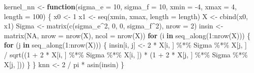 \documentclass[
]{article}
\newenvironment{Shaded}{\begin{snugshade}}{\end{snugshade}}
\newcommand{\AttributeTok}[1]{\textcolor[rgb]{0.77,0.63,0.00}{#1}}
\newcommand{\ConstantTok}[1]{\textcolor[rgb]{0.00,0.00,0.00}{#1}}
\newcommand{\ControlFlowTok}[1]{\textcolor[rgb]{0.13,0.29,0.53}{\textbf{#1}}}
\newcommand{\DecValTok}[1]{\textcolor[rgb]{0.00,0.00,0.81}{#1}}
\newcommand{\FunctionTok}[1]{\textcolor[rgb]{0.00,0.00,0.00}{#1}}
\newcommand{\NormalTok}[1]{#1}
\newcommand{\OtherTok}[1]{\textcolor[rgb]{0.56,0.35,0.01}{#1}}
\newcommand{\SpecialCharTok}[1]{\textcolor[rgb]{0.00,0.00,0.00}{#1}}
\begin{document}
\begin{Shaded}
\begin{Highlighting}[]
\NormalTok{kernel\_nn }\OtherTok{\textless{}{-}} \ControlFlowTok{function}\NormalTok{(}\AttributeTok{sigma\_e =} \DecValTok{10}\NormalTok{, }
                      \AttributeTok{sigma\_f =} \DecValTok{10}\NormalTok{, }
                      \AttributeTok{xmin =} \SpecialCharTok{{-}}\DecValTok{4}\NormalTok{, }
                      \AttributeTok{xmax =} \DecValTok{4}\NormalTok{, }
                      \AttributeTok{length =} \DecValTok{100}\NormalTok{) \{}
\NormalTok{  x0 }\OtherTok{\textless{}{-}} \DecValTok{1} 
\NormalTok{  x1 }\OtherTok{\textless{}{-}} \FunctionTok{seq}\NormalTok{(xmin, xmax, }\AttributeTok{length =}\NormalTok{ length)}
\NormalTok{  X }\OtherTok{\textless{}{-}} \FunctionTok{cbind}\NormalTok{(x0, x1)}
\NormalTok{  Sigma }\OtherTok{\textless{}{-}} \FunctionTok{matrix}\NormalTok{(}\FunctionTok{c}\NormalTok{(sigma\_e}\SpecialCharTok{\^{}}\DecValTok{2}\NormalTok{, }\DecValTok{0}\NormalTok{, }\DecValTok{0}\NormalTok{, sigma\_f}\SpecialCharTok{\^{}}\DecValTok{2}\NormalTok{), }\AttributeTok{nrow =} \DecValTok{2}\NormalTok{)}
\NormalTok{  insin }\OtherTok{\textless{}{-}} \FunctionTok{matrix}\NormalTok{(}\ConstantTok{NA}\NormalTok{, }\AttributeTok{nrow =} \FunctionTok{nrow}\NormalTok{(X), }\AttributeTok{ncol =} \FunctionTok{nrow}\NormalTok{(X))}
  \ControlFlowTok{for}\NormalTok{ (i }\ControlFlowTok{in} \FunctionTok{seq\_along}\NormalTok{(}\DecValTok{1}\SpecialCharTok{:}\FunctionTok{nrow}\NormalTok{(X))) \{}
    \ControlFlowTok{for}\NormalTok{ (j }\ControlFlowTok{in} \FunctionTok{seq\_along}\NormalTok{(}\DecValTok{1}\SpecialCharTok{:}\FunctionTok{nrow}\NormalTok{(X))) \{}
\NormalTok{      insin[i, j] }\OtherTok{\textless{}{-}} \DecValTok{2} \SpecialCharTok{*}\NormalTok{ X[i, ] }\SpecialCharTok{\%*\%}\NormalTok{ Sigma }\SpecialCharTok{\%*\%}\NormalTok{ X[j, ] }\SpecialCharTok{/}
        \FunctionTok{sqrt}\NormalTok{((}\DecValTok{1} \SpecialCharTok{+} \DecValTok{2} \SpecialCharTok{*}\NormalTok{ X[i, ] }\SpecialCharTok{\%*\%}\NormalTok{ Sigma }\SpecialCharTok{\%*\%}\NormalTok{ X[i, ]) }\SpecialCharTok{*}\NormalTok{ (}\DecValTok{1} \SpecialCharTok{+} \DecValTok{2} \SpecialCharTok{*}\NormalTok{ X[j, ] }\SpecialCharTok{\%*\%}\NormalTok{ Sigma }\SpecialCharTok{\%*\%}\NormalTok{ X[j, ]))}
\NormalTok{    \}}
\NormalTok{  \}}
\NormalTok{  knn }\OtherTok{\textless{}{-}} \DecValTok{2} \SpecialCharTok{/}\NormalTok{ pi }\SpecialCharTok{*} \FunctionTok{asin}\NormalTok{(insin)}
\NormalTok{\}}
\end{Highlighting}
\end{Shaded}
\end{document}
